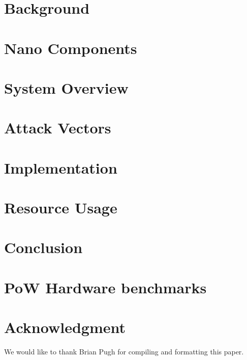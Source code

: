 \documentclass[journal]{IEEEtran}
\begin{document}
\section{Background}


\section{Nano Components}


\section{System Overview}


\section{Attack Vectors}


\section{Implementation}


\section{Resource Usage}


\section{Conclusion}


\appendices
\section{PoW Hardware benchmarks} \label{sec:pow_hardware_benchmarks}




\section*{Acknowledgment}
We would like to thank Brian Pugh for compiling and formatting this paper.
\end{document}
